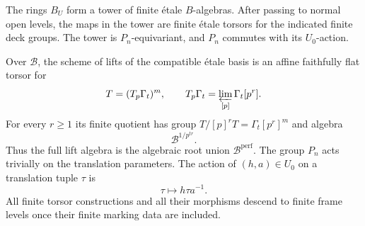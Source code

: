 \begin{proposition}\label{prop:frame-torsor}
The rings $B_U$ form a tower of finite \'etale $B$-algebras.
After passing to normal open levels, the maps in the tower
are finite \'etale torsors for the indicated finite deck
groups.  The tower is $P_n$-equivariant, and $P_n$ commutes
with its $U_0$-action.

Over $\mathcal B$, the scheme of lifts of the compatible
\'etale basis is an affine faithfully flat torsor for
\begin{equation}\label{rings:translation-group}
 T=(T_p\Gamma_t)^m,
 \qquad
 T_p\Gamma_t=\varprojlim_{[p]}\Gamma_t[p^r].
\end{equation}
For every $r\geq1$ its finite quotient has group
$T/[p]^rT=\Gamma_t[p^r]^m$ and algebra
\begin{equation}\label{rings:root-torsor}
 \mathcal B^{1/p^{tr}}.
\end{equation}
Thus the full lift algebra is the algebraic root union
$\mathcal B^{\mathrm{perf}}$.
The group $P_n$ acts trivially on the translation parameters.
The action of $(h,a)\in U_0$ on a translation tuple $\tau$ is
\begin{equation}\label{rings:auxiliary-action}
 \tau\longmapsto h\tau a^{-1}.
\end{equation}
All finite torsor constructions and all their morphisms
descend to finite frame levels once their finite marking
data are included.
\end{proposition}

